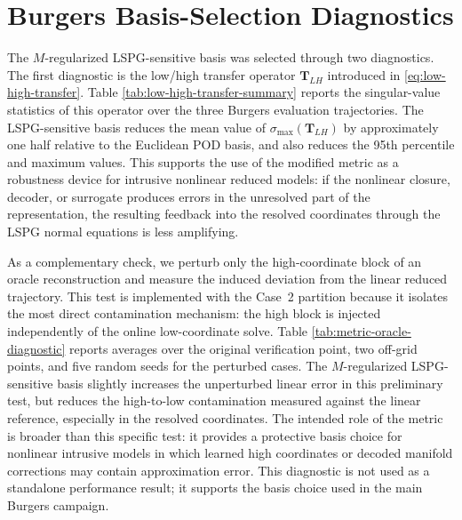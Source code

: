 \documentclass[11pt]{article}
\begin{document}
\appendix

\section{Burgers Basis-Selection Diagnostics}
\label{app:basis-selection-diagnostics}

The $M$-regularized LSPG-sensitive basis was selected through two diagnostics.
The first diagnostic is the low/high transfer operator
$\mathbf T_{LH}$ introduced in \eqref{eq:low-high-transfer}.  Table
\ref{tab:low-high-transfer-summary} reports the singular-value statistics of
this operator over the three Burgers evaluation trajectories.  The
LSPG-sensitive basis reduces the mean value of
$\sigma_{\max}(\mathbf T_{LH})$ by approximately one half relative to the
Euclidean POD basis, and also reduces the 95th percentile and maximum values.
This supports the use of the modified metric as a robustness device for
intrusive nonlinear reduced models: if the nonlinear closure, decoder, or
surrogate produces errors in the unresolved part of the representation, the
resulting feedback into the resolved coordinates through the LSPG normal
equations is less amplifying.

\begin{table}[H]
\centering
\caption{Burgers low/high transfer diagnostic for basis selection. The table reports statistics of $\sigma_{\max}(\mathbf T_{LH})$ and of the corresponding $M$-weighted state gain $g_M$ over the original three evaluation trajectories.}
\label{tab:low-high-transfer-summary}
\resizebox{\textwidth}{!}{%

}
\end{table}

As a complementary check, we perturb only the high-coordinate block of an
oracle reconstruction and measure the induced deviation from the linear
reduced trajectory.  This test is implemented with the Case~2 partition because
it isolates the most direct contamination mechanism: the high block is injected
independently of the online low-coordinate solve.  Table
\ref{tab:metric-oracle-diagnostic} reports averages over the original
verification point, two off-grid points, and five random seeds for the
perturbed cases.
The $M$-regularized LSPG-sensitive basis slightly increases the unperturbed
linear error in this preliminary test, but reduces the high-to-low
contamination measured against the linear reference, especially in the
resolved coordinates.  The intended role of the metric is broader than this
specific test: it provides a protective basis choice for nonlinear intrusive
models in which learned high coordinates or decoded manifold corrections may
contain approximation error.  This diagnostic is not used as a standalone
performance result; it supports the basis choice used in the main Burgers
campaign.
\end{document}
